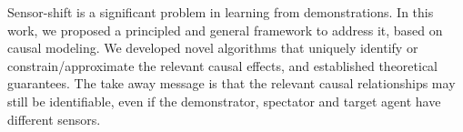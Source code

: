 \documentclass[letterpaper]{article} %
\theoremstyle{definition}%
\theoremstyle{definition}
\begin{document}
Sensor-shift is a significant problem in learning from demonstrations. In this work, we proposed a principled and general framework to address it, based on causal modeling.
We developed novel algorithms that uniquely identify or constrain/approximate the relevant causal effects, and established theoretical guarantees.
The take away message is that the relevant causal relationships may still be identifiable, even if the demonstrator, spectator and target agent have different sensors.







%
\end{document}

